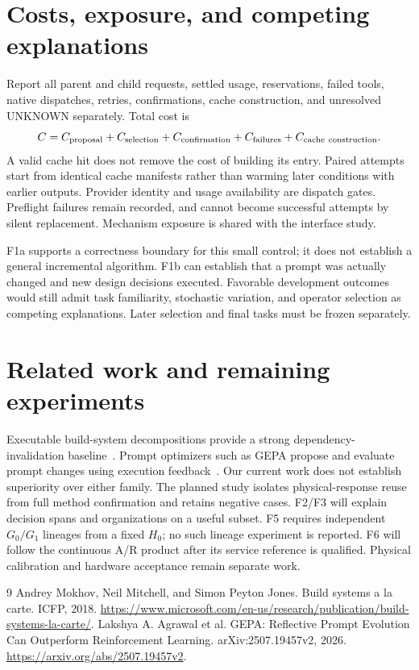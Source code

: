 \documentclass[10pt]{article}
\begin{document}
\section{Costs, exposure, and competing explanations}
Report all parent and child requests, settled usage, reservations, failed tools,
native dispatches, retries, confirmations, cache construction, and unresolved
UNKNOWN separately. Total cost is
\[
C=C_{\rm proposal}+C_{\rm selection}+C_{\rm confirmation}
  +C_{\rm failures}+C_{\rm cache\ construction}.
\]
A valid cache hit does not remove the cost of building its entry. Paired attempts
start from identical cache manifests rather than warming later conditions with
earlier outputs. Provider identity and usage availability are dispatch gates.
Preflight failures remain recorded, and cannot become successful attempts by
silent replacement. Mechanism exposure is shared with the interface study.

F1a supports a correctness boundary for this small control; it does not establish
a general incremental algorithm. F1b can establish that a prompt was actually
changed and new design decisions executed. Favorable development outcomes would
still admit task familiarity, stochastic variation, and operator selection as
competing explanations. Later selection and final tasks must be frozen separately.

\section{Related work and remaining experiments}
Executable build-system decompositions provide a strong dependency-invalidation
baseline~\cite{mokhov2018}. Prompt optimizers such as GEPA propose and evaluate
prompt changes using execution feedback~\cite{agrawal2026gepa}. Our current work
does not establish superiority over either family. The planned study isolates
physical-response reuse from full method confirmation and retains negative cases.
F2/F3 will explain decision spans and organizations on a useful subset. F5 requires
independent $G_0/G_1$ lineages from a fixed $H_0$; no such lineage experiment is
reported. F6 will follow the continuous A/R product after its service reference is
qualified. Physical calibration and hardware acceptance remain separate work.

\begin{thebibliography}{9}
 Andrey Mokhov, Neil Mitchell, and Simon Peyton Jones.
Build systems a la carte. ICFP, 2018.
\url{https://www.microsoft.com/en-us/research/publication/build-systems-la-carte/}.
 Lakshya A. Agrawal et al.
GEPA: Reflective Prompt Evolution Can Outperform Reinforcement Learning.
arXiv:2507.19457v2, 2026.
\url{https://arxiv.org/abs/2507.19457v2}.
\end{thebibliography}
\end{document}
